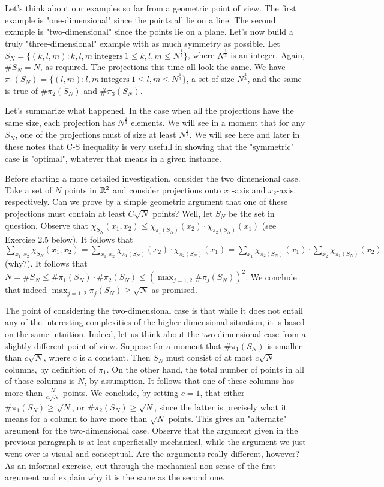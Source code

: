 Let's think about our examples so far from a geometric point of view. The
first example is "one-dimensional" since the points all lie on a line.
The second example is "two-dimensional" since the points lie on a plane.
Let's now build a truly "three-dimensional" example with as much symmetry
as possible. Let $S_N=\{(k,l,m): k,l,m \ \text{integers} \ 1 \leq k,l,m
\leq N^{\frac{1}{3}}\}$, where $N^{\frac{1}{3}}$ is an integer. Again,
$\# S_N=N$, as required. The projections this time all look the same. We
have $\pi_1(S_N)=\{(l,m): l,m \ \text{integers} \ 1 \leq l,m \leq
N^{\frac{1}{3}}\}$, a set of size $N^{\frac{2}{3}}$, and the same is true
of $\# \pi_2(S_N)$ and $\# \pi_3(S_N)$.

Let's summarize what happened. In the case when all the projections have
the same size, each projection has $N^{\frac{2}{3}}$ elements. We will
see in a moment that for any $S_N$, one of the projections must of size
at least $N^{\frac{2}{3}}$. We will see here and later in these notes
that C-S inequality is very usefull in showing that the "symmetric" case
is "optimal", whatever that means in a given instance.

Before starting a more detailed investigation, consider the two
dimensional case. Take a set of $N$ points in ${\Bbb R}^2$ and consider
projections onto $x_1$-axis and $x_2$-axis, respectively. Can we prove
by a simple geometric argument that one of these projections must contain
at least $C\sqrt{N}$ points? Well, let $S_N$ be the set in
question. Observe that $\chi_{S_N}(x_1,x_2) \leq \chi_{\pi_1(S_N)}(x_2)
\cdot \chi_{\pi_2(S_N)}(x_1)$ (see Exercise 2.5 below). It follows that
$\sum_{x_1,x_2} \chi_{S_N}(x_1,x_2)=\sum_{x_1,x_2} \chi_{\pi_1(S_N)}(x_2)
\cdot \chi_{\pi_2(S_N)}(x_1)=\sum_{x_1} \chi_{\pi_2(S_N)}(x_1) \cdot
\sum_{x_2} \chi_{\pi_1(S_N)}(x_2)$ (why?). It follows that $N=\# S_N \leq
\# \pi_1(S_N) \cdot \# \pi_2(S_N) \leq {\left(\max_{j=1,2} \# \pi_j(S_N)
\right)}^2$. We conclude that indeed $\max_{j=1,2} \pi_j(S_N) \ge
\sqrt{N}$ as promised. 

The point of considering the two-dimensional case is that while it does
not entail any of the interesting complexities of the higher dimensional
situation, it is based on the same intuition. Indeed, let us think about
the two-dimensional case from a slightly different point of view. Suppose
for a moment that $\# \pi_1(S_N)$ is smaller than $c\sqrt{N}$, where
$c$ is a constant. Then $S_N$ must consist of at most $c \sqrt{N}$
columns, by definition of $\pi_1$. On the other hand, the total number of
points in all of those columns is $N$, by assumption. It follows that one
of these columns has more than $\frac{N}{c\sqrt{N}}$ points. We conclude,
by setting $c=1$, that either $\# \pi_1(S_N) \ge \sqrt{N}$, or $\#
\pi_2(S_N) \ge \sqrt{N}$, since the latter is precisely what it means for
a column to have more than $\sqrt{N}$ points. This gives an "alternate"
argument for the two-dimensional case. Observe that the argument given in
the previous paragraph is at leat superficially mechanical, while the
argument we just went over is visual and conceptual. Are the arguments
really different, however? As an informal exercise, cut through the
mechanical non-sense of the first argument and explain why it is the same
as the second one. 

